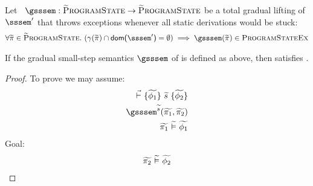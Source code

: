 Let ~$\gsssem : \setGProgramState \rightarrow \setGProgramState$ be a total gradual lifting of $\sssem'$ that throws exceptions whenever all static derivations would be stuck:
\begin{align}
\forall \grad{\pi} \in \setGProgramState.~ (\gamma(\grad{\pi}) \cap \dom{\sssem'} = \emptyset) \implies \gsssem(\grad{\pi}) \in \setProgramStateEx
\label{frm:perf-ex}
\end{align}

\begin{theorem}[]
    If the gradual small-step semantics $\gsssem$ of \gvl is defined as above, then \gvl satisfies .
\end{theorem}
\begin{proof}
    To prove  we may assume:
    \begin{align}
    \label{frm:tmp0}
    \dgthoare{}{\grad{\phi_1}}{\grad{s}}{\grad{\phi_2}}\\
    \label{frm:tmp1}
    \gsssem^{\grad{s}}(\grad{\pi_1}, \grad{\pi_2})\\
    \label{frm:tmp2}
    \evalgphiGen{\grad{\pi_1}}{\grad{\phi_1}}
    \end{align}
    Goal: 
    \begin{align}
    \label{frm:tmp3}
    \widetilde{\pi_2} \,\,\widetilde{\vDash}\,\, \widetilde{\phi_2}
    \end{align}
    

\end{proof}
